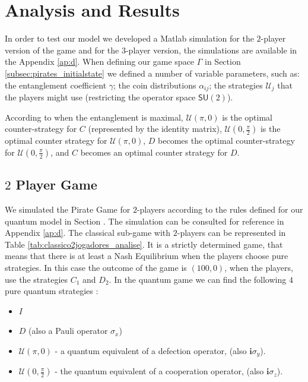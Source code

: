 \section{Analysis and Results}
\label{sec:description_3}


In order to test our model we developed a Matlab simulation for the $2$-player version of the game and for the $3$-player version, the simulations are available in the Appendix \ref{ap:d}. When defining our game space $\Gamma$ in Section \ref{subsec:pirates_initialstate} we defined a number of variable parameters, such as: the entanglement coefficient $\gamma$; the coin distributions $\alpha_{ij}$; the strategies $\mathcal{U}_{j}$ that the players might use (restricting the operator space $\mathsf{SU}(2)$).

According to \cite{Du} when the entanglement is maximal, $\mathcal{U}(\pi, 0)$ is the optimal counter-strategy for $C$ (represented by the identity matrix), $\mathcal{U}(0, \frac{\pi}{2})$ is the optimal counter strategy for $\mathcal{U}(\pi, 0)$, $D$ becomes the optimal counter-strategy for $\mathcal{U}(0, \frac{\pi}{2})$, and $C$ becomes an optimal counter strategy for $D$. 

\subsection{$2$ Player Game}
\label{subsec:2playergame}

We simulated the Pirate Game for $2$-players according to the rules defined for our quantum model in Section . The simulation can be consulted for reference in Appendix \ref{ap:d}. The classical sub-game with $2$-players can be represented in Table \ref{tab:classico2jogadores_analise}. It is a strictly determined game, that means that there is at least a Nash Equilibrium when the players choose pure strategies\cite{Leyton-Brown2008:Essentials_Game_Theory}. In this case the outcome of the game is $(100, 0)$, when the players, use the strategies $C_{1}$ and $D_{2}$.  In the quantum game we can find the following $4$ pure quantum strategies :

\begin{itemize}

\item $I$

\item $D$ (also a Pauli operator $\sigma_{x}$)

\item $\mathcal{U}( \pi, 0)$ - a quantum equivalent of a defection operator, (also $\mathbf{i}\sigma_y$).

\item $\mathcal{U}( 0, \frac{\pi}{2})$ - the quantum equivalent of a cooperation operator, (also $\mathbf{i}\sigma_z$).

\end{itemize}

